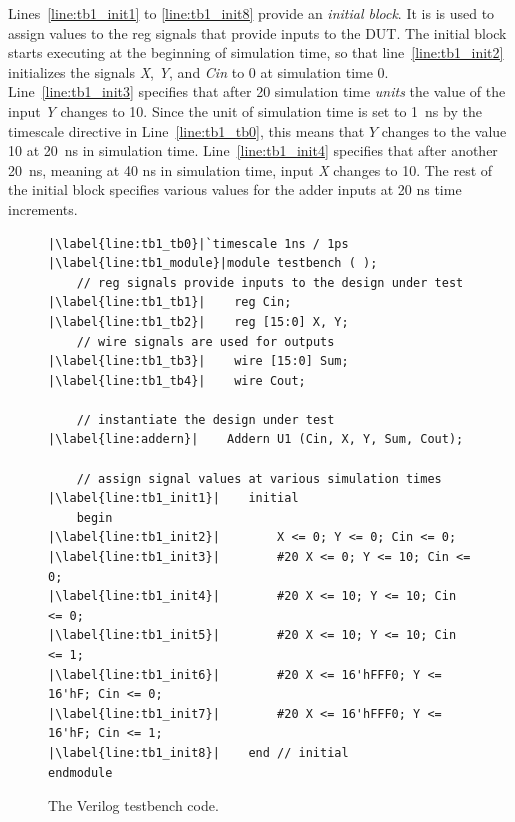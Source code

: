 \documentclass[11pt, twoside, pdftex]{article}
\begin{document}
\noindent
Lines~\ref{line:tb1_init1} to \ref{line:tb1_init8} provide an {\it initial block}. It is is used
to assign values to the reg signals that provide inputs to the DUT. The initial block
starts executing at the beginning of simulation time, so that line~\ref{line:tb1_init2} 
initializes the signals {\it X}, {\it Y}, and {\it Cin} to 0 at simulation time 0.
Line~\ref{line:tb1_init3} specifies that after 20
simulation time {\it units} the value of the input {\it Y} changes to 10. Since the
unit of simulation time is set to 1~ns by the timescale directive in 
Line~\ref{line:tb1_tb0}, this
means that $Y$ changes to the value 10 at 20~ns in simulation time. 
Line~\ref{line:tb1_init4} specifies that after another 20~ns, meaning at 40 ns in simulation
time, input {\it X} changes to 10. The rest of the
initial block specifies various values for the adder inputs at 20 ns time increments.

\lstset{language=Verilog,numbers=left,escapechar=|}
\begin{figure}[h]
\begin{center}
\begin{minipage}[t]{12.5 cm}
\begin{lstlisting}[name=testbench]
|\label{line:tb1_tb0}|`timescale 1ns / 1ps
|\label{line:tb1_module}|module testbench ( );
    // reg signals provide inputs to the design under test
|\label{line:tb1_tb1}|    reg Cin;
|\label{line:tb1_tb2}|    reg [15:0] X, Y;
    // wire signals are used for outputs
|\label{line:tb1_tb3}|    wire [15:0] Sum;
|\label{line:tb1_tb4}|    wire Cout;

    // instantiate the design under test
|\label{line:addern}|    Addern U1 (Cin, X, Y, Sum, Cout);

    // assign signal values at various simulation times
|\label{line:tb1_init1}|    initial 
    begin
|\label{line:tb1_init2}|        X <= 0; Y <= 0; Cin <= 0;
|\label{line:tb1_init3}|        #20 X <= 0; Y <= 10; Cin <= 0;
|\label{line:tb1_init4}|        #20 X <= 10; Y <= 10; Cin <= 0;
|\label{line:tb1_init5}|        #20 X <= 10; Y <= 10; Cin <= 1;
|\label{line:tb1_init6}|        #20 X <= 16'hFFF0; Y <= 16'hF; Cin <= 0;
|\label{line:tb1_init7}|        #20 X <= 16'hFFF0; Y <= 16'hF; Cin <= 1;
|\label{line:tb1_init8}|    end // initial
endmodule
\end{lstlisting}
\end{minipage}
\caption{The Verilog testbench code.}
\label{fig:tb1}
\end{center}
\end{figure}
\end{document}
